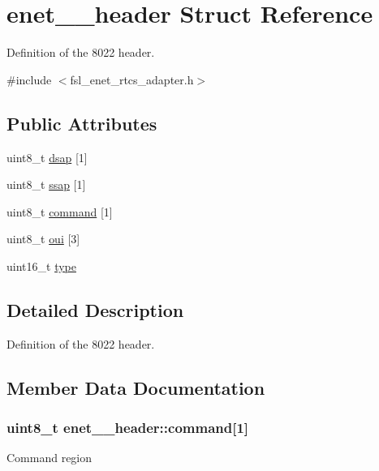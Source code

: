 \hypertarget{structenet__8022__header}{}\section{enet\+\_\+\_\+header Struct Reference}
\label{structenet__8022__header}


Definition of the 8022 header.  




{\ttfamily \#include $<$fsl\+\_\+enet\+\_\+rtcs\+\_\+adapter.\+h$>$}

\subsection*{Public Attributes}
\begin{DoxyCompactItemize}
\item 
uint8\+\_\+t \hyperlink{structenet__8022__header_a69a93d84b05e0adce0360fc71bbcc87d}{dsap} \mbox{[}1\mbox{]}
\item 
uint8\+\_\+t \hyperlink{structenet__8022__header_aec71d6a509fbb2585c8750fdc8ec6abc}{ssap} \mbox{[}1\mbox{]}
\item 
uint8\+\_\+t \hyperlink{structenet__8022__header_aa71b42b85e9335312a58970599140feb}{command} \mbox{[}1\mbox{]}
\item 
uint8\+\_\+t \hyperlink{structenet__8022__header_ad5e46845abf176af3bcd641210a2197d}{oui} \mbox{[}3\mbox{]}
\item 
uint16\+\_\+t \hyperlink{structenet__8022__header_a2c60f1c282936065b25385df64c65929}{type}
\end{DoxyCompactItemize}


\subsection{Detailed Description}
Definition of the 8022 header. 

\subsection{Member Data Documentation}
\subsubsection[{\texorpdfstring{command}{command}}]{\setlength{\rightskip}{0pt plus 5cm}uint8\+\_\+t enet\+\_\+\_\+header\+::command\mbox{[}1\mbox{]}}\hypertarget{structenet__8022__header_aa71b42b85e9335312a58970599140feb}{}\label{structenet__8022__header_aa71b42b85e9335312a58970599140feb}
Command region 
